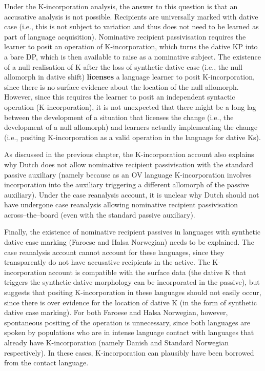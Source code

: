 {Under the K-incorporation analysis, the answer to this question is that an accusative analysis is not possible. Recipients are universally marked with dative case (i.e., this is not subject to variation and thus does not need to be learned as part of language acquisition). Nominative recipient passivisation requires the learner to posit an operation of K-incorporation, which turns the dative KP into a bare DP, which is then available to raise as a nominative subject. The existence of a null realisation of K after the loss of synthetic dative case (i.e., the null allomorph in dative shift) \textbf{licenses} a language learner to posit K-incorporation, since there is no surface evidence about the location of the null allomorph. However, since this requires the learner to posit an independent syntactic operation (K-incorporation), it is not unexpected that there might be a long lag between the development of a situation that licenses the change (i.e., the development of a null allomorph) and learners actually implementing the change (i.e., positing K-incorporation as a valid operation in the language for dative Ks).

As discussed in the previous chapter, the K-incorporation account also explains why Dutch does not allow nominative recipient passivisation with the standard passive auxiliary (namely because as an OV language K-incorporation involves incorporation into the auxiliary triggering a different allomorph of the passive auxiliary). Under the case reanalysis account, it is unclear why Dutch should not have undergone case reanalysis allowing nominative recipient passivisation across--the--board (even with the standard passive auxiliary).

Finally, the existence of nominative recipient passives in languages with synthetic dative case marking (Faroese and Halsa Norwegian) needs to be explained. The case reanalysis account cannot account for these languages, since they transparently do not have accusative recipients in the active. The K-incorporation account is compatible with the surface data (the dative K that triggers the synthetic dative morphology can be incorporated in the passive), but suggests that positing K-incorporation in these languages should not easily occur, since there is over evidence for the location of dative K (in the form of synthetic dative case marking). For both Faroese and Halsa Norwegian, however, spontaneous positing of the operation is unnecessary, since both languages are spoken by populations who are in intense language contact with languages that already have K-incorporation (namely Danish and Standard Norwegian respectively). In these cases, K-incorporation can plausibly have been borrowed from the contact language.


}
